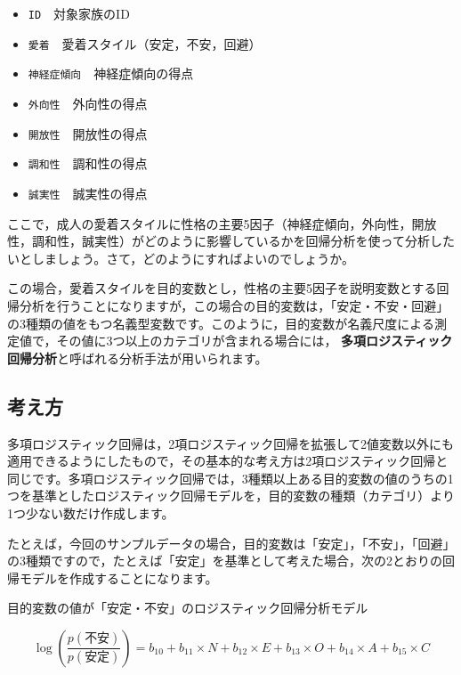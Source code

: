 \documentclass[
  12pt,
  a5jpaper,
  lualatex, ja=standard]{bxjsbook}
\providecommand{\tightlist}{%
  \setlength{\itemsep}{0pt}\setlength{\parskip}{0pt}}
\renewcommand{\emph}[1]{\textbf{\color{emph} #1}}
\newenvironment{jmvvar}{%
	\begin{center}%
	\begin{tcolorbox}[%
		title=変数一覧,
		colframe=daidai,
		colbacktitle=daidai!30!white,
		coltitle=daidai!10!black,
		colback=daidai!2!white,
		breakable,
		width=.9\textwidth
		]\small\addtolength{\leftmargini}{-3\labelsep}%
	}%
	{\end{tcolorbox}\end{center}}
\newenvironment{jmvgray}{%
	\begin{center}%
	\begin{tcolorbox}[%
		colframe=gline,
		colbacktitle=gmoji,
		colback=gmoji!2!white,
		breakable,
		width=.9\textwidth,
		]\small\addtolength{\leftmargini}{-3\labelsep}%
	}%
	{\end{tcolorbox}\end{center}}
\begin{document}
\begin{jmvvar}

\begin{itemize}
\tightlist
\item
  \texttt{ID}　対象家族のID
\item
  \texttt{愛着}　愛着スタイル（安定，不安，回避）
\item
  \texttt{神経症傾向}　神経症傾向の得点
\item
  \texttt{外向性}　外向性の得点
\item
  \texttt{開放性}　開放性の得点
\item
  \texttt{調和性}　調和性の得点
\item
  \texttt{誠実性}　誠実性の得点
\end{itemize}

\end{jmvvar}

ここで，成人の愛着スタイルに性格の主要5因子（神経症傾向，外向性，開放性，調和性，誠実性）がどのように影響しているかを回帰分析を使って分析したいとしましょう。さて，どのようにすればよいのでしょうか。

この場合，愛着スタイルを目的変数とし，性格の主要5因子を説明変数とする回帰分析を行うことになりますが，この場合の目的変数は，「安定・不安・回避」の3種類の値をもつ名義型変数です。このように，目的変数が名義尺度による測定値で，その値に3つ以上のカテゴリが含まれる場合には，\emph{多項ロジスティック回帰分析}と呼ばれる分析手法が用いられます。

\hypertarget{sub:regression-multinomial}{%
\subsection{考え方}\label{sub:regression-multinomial}}

多項ロジスティック回帰は，2項ロジスティック回帰を拡張して2値変数以外にも適用できるようにしたもので，その基本的な考え方は2項ロジスティック回帰と同じです。多項ロジスティック回帰では，3種類以上ある目的変数の値のうちの1つを基準としたロジスティック回帰モデルを，目的変数の種類（カテゴリ）より1つ少ない数だけ作成します。

たとえば，今回のサンプルデータの場合，目的変数は「安定」，「不安」，「回避」の3種類ですので，たとえば「安定」を基準として考えた場合，次の2とおりの回帰モデルを作成することになります。

\begin{jmvgray}
目的変数の値が「安定・不安」のロジスティック回帰分析モデル

\[
\log\left(\displaystyle\frac{p(\text{不安})}{p(\text{安定})}\right) = b_{10} + b_{11} \times N+ b_{12} \times E+ b_{13} \times O+ b_{14} \times A+ b_{15} \times C
\]

\end{jmvgray}
\end{document}
